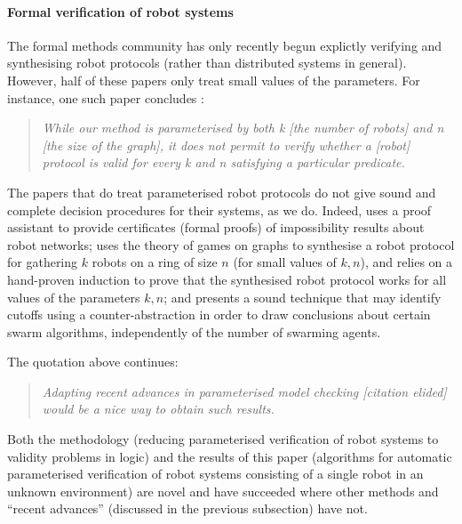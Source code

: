 \documentclass{aamas2015}
\newcommand{\sr}[1]{\footnote{{\color{red} Note. #1}}}
\begin{document}
\paragraph{Formal verification of robot systems}
The formal methods community has only recently \cite{HMM11,Devi11,Bonnet12,Berard13,ABCTU13,MPST14} begun explictly verifying and synthesising robot protocols (rather than distributed systems in general). However, half of these papers only treat small values of the parameters.  For instance, one such paper concludes \cite[page 11]{Berard13}: 

\begin{quotation}
{\it While our method is parameterised by both k [the number of robots] and n [the size of the graph],
it does not permit to verify 
whether a [robot] protocol is valid for every k and n satisfying a particular predicate. 
}
\end{quotation}

The papers that do treat parameterised robot protocols do not give sound and complete decision procedures for their systems, as we do. Indeed, \cite{ABCTU13} uses a proof assistant to provide certificates (formal proofs) of impossibility results about robot networks; \cite{MPST14} uses the theory of games on graphs to synthesise a robot protocol for gathering $k$ robots on a ring of size $n$ (for small values of $k,n$), and relies on a hand-proven induction to prove that the synthesised robot protocol works for all values of the parameters $k,n$; and \cite{KoLo15} presents a sound technique that may identify cutoffs using a counter-abstraction in order to draw conclusions about certain swarm algorithms, independently of the number of swarming agents.

The quotation above continues:
\begin{quotation}
{\it Adapting recent advances in parameterised model checking [citation elided] would be a nice way 
to obtain such results. }
\end{quotation}

Both the methodology (reducing parameterised verification of robot systems to validity problems in logic) and the results of this paper (algorithms for automatic parameterised verification of robot systems consisting of a single robot in an unknown environment) are novel and have succeeded where other methods and ``recent advances'' (discussed in the previous subsection) have not.  

%
%
\end{document}
